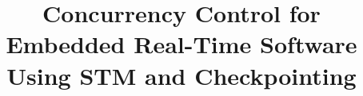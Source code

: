 \documentclass[conference]{IEEEtran}
\begin{document}
%
\title{Concurrency Control for Embedded Real-Time Software Using STM and Checkpointing}


\begin{comment}
\author{\IEEEauthorblockN{Mohammed Elshambakey}
\IEEEauthorblockA{Electrical and Computer Engineering School, VT\\
Blacksburg, VA, USA, 24060\\
Email: shambake@vt.edu}
\and
\IEEEauthorblockN{Binoy Ravindran}
\IEEEauthorblockA{Electrical and Computer Engineering School, VT\\
Blacksburg, VA, USA, 24060\\
Email: binoy@vt.edu}}
\end{comment}


% 








\maketitle
\end{document}
